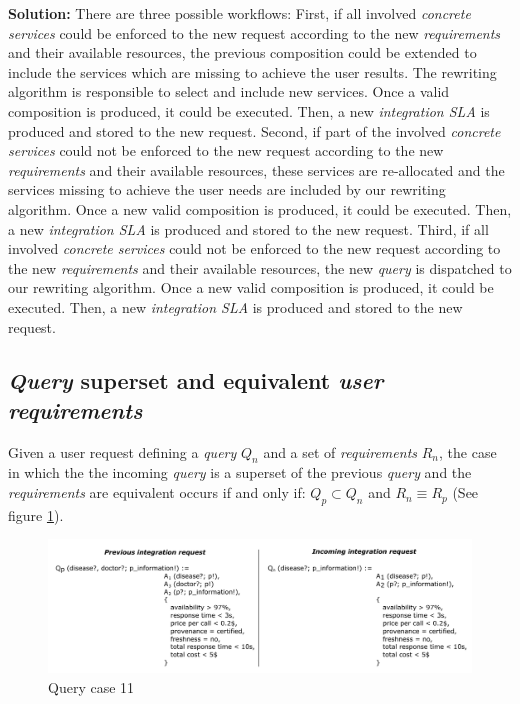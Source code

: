 \bigskip
\noindent \textbf{Solution:} There are three possible workflows: First, if all involved \textsl{concrete services} could be enforced to the new request according to the new \textsl{requirements} and their available resources, the previous composition could be extended to include the services which are missing to achieve the user results. The rewriting algorithm is responsible to select and include new services. Once a valid composition is produced, it could be executed. Then, a new \textsl{integration SLA} is produced and stored to the new request. Second, if part of the involved \textsl{concrete services} could not be enforced to the new request according to the new \textsl{requirements} and their available resources, these services are re-allocated and the services missing to achieve the user needs are included by our rewriting algorithm. Once a new valid composition is produced, it could be executed. Then, a new \textsl{integration SLA} is produced and stored to the new request. Third, if all involved \textsl{concrete services} could not be enforced to the new request according to the new \textsl{requirements} and their available resources, the new \textsl{query} is dispatched to our rewriting algorithm. Once a new valid composition is produced, it could be executed. Then, a new \textsl{integration SLA} is produced and stored to the new request.

\subsection{\textsl{Query} superset and equivalent \textsl{user requirements}}
Given a user request defining a \textsl{query} $Q_{n}$ and a set of \textsl{requirements} $R_{n}$, the case in which the the incoming \textsl{query} is a superset of the previous \textsl{query} and the \textsl{requirements} are equivalent occurs if and only if: $Q_{p} \subset Q_{n}$ and $R_{n} \equiv R_{p}$ (See figure \ref{fig:case11}).

\begin{figure}[h!]
\center
\includegraphics[scale=0.85]{figures/query-case-11.pdf}\caption{Query case 11} \label{fig:case11}
\end{figure}

